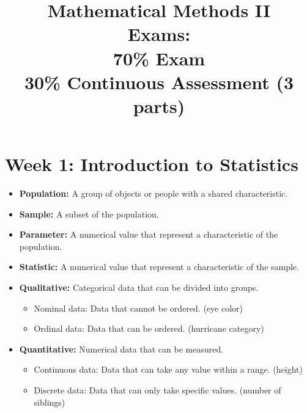 \documentclass[12pt]{article}
\title{
Mathematical Methods II\\[2ex]
Exams:\\
70\% Exam\\
30\% Continuous Assessment (3 parts)
}
\author{}     %
\date{}       %
\theoremstyle{definition}
\theoremstyle{plain}
\begin{document}
\maketitle
\pagebreak



\tableofcontents
\pagebreak
\section{Week 1: Introduction to Statistics}
\begin{definitionbox}[Definitions]
    \begin{itemize}
        \item \textbf{Population:} A group of objects or people with a shared characteristic.
        \item \textbf{Sample:} A subset of the population.
        \item \textbf{Parameter:} A numerical value that represent a characteristic of the population.
        \item \textbf{Statistic:} A numerical value that represent a characteristic of the sample.
    \end{itemize}
\end{definitionbox}

\begin{notebox}
    \begin{itemize}
        \item \textbf{Qualitative:} Categorical data that can be divided into groups.
            \begin{itemize}
                \item Nominal data: Data that cannot be ordered. (eye color)
                \item Ordinal data: Data that can be ordered. (hurricane category)
            \end{itemize}
        \item \textbf{Quantitative:} Numerical data that can be measured.
            \begin{itemize}
                \item Continuous data: Data that can take any value within a range. (height)
                \item Discrete data: Data that can only take specific values. (number of siblings)
            \end{itemize}
    \end{itemize}

\end{notebox}
\end{document}

